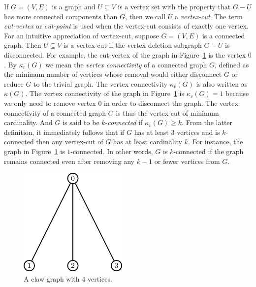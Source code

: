 If $G = (V,E)$ is a graph and $U \subseteq V$ is a vertex set with the
property that $G - U$ has more connected components than $G$, then we
call $U$ a \emph{vertex-cut}. The term
\emph{cut-vertex} or
\emph{cut-point} is used when the vertex-cut consists
of exactly one vertex. For an intuitive appreciation of vertex-cut,
suppose $G = (V,E)$ is a connected graph. Then $U \subseteq V$ is a
vertex-cut if the vertex deletion
subgraph $G - U$ is disconnected. For example, the cut-vertex of the
graph in Figure~\ref{fig:distance_connectivity:claw_graph} is the
vertex $0$. By $\kappa_v(G)$ we mean the
\emph{vertex connectivity} of a connected
graph $G$, defined as the minimum number of vertices whose removal
would either disconnect $G$ or reduce $G$ to the trivial graph. The
vertex connectivity $\kappa_v(G)$ is also written as
$\kappa(G)$. The vertex connectivity of the graph
in Figure~\ref{fig:distance_connectivity:claw_graph} is
$\kappa_v(G) = 1$ because we only need to remove vertex $0$ in order
to disconnect the graph. The vertex connectivity of a connected graph
$G$ is thus the vertex-cut of minimum cardinality. And $G$ is said to
be $k$-\emph{connected} if $\kappa_v(G) \geq k$.
From the latter definition, it immediately follows that if $G$ has at
least $3$ vertices and is $k$-connected then any vertex-cut of $G$ has
at least cardinality $k$. For instance, the graph in
Figure~\ref{fig:distance_connectivity:claw_graph} is $1$-connected. In
other words, $G$ is $k$-connected if the graph remains connected even
after removing any $k - 1$ or fewer vertices from $G$.

\begin{figure}[!htbp]
\centering
{}
\includegraphics{image/distance-connectivity/claw-graph}
\caption{A claw graph with $4$ vertices.}
\label{fig:distance_connectivity:claw_graph}
\end{figure}

